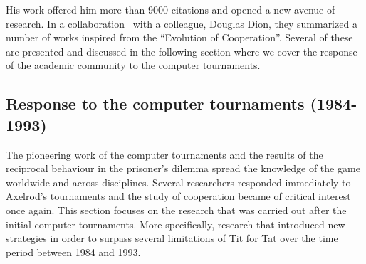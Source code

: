 \documentclass{article}
\theoremstyle{definition}
\begin{document}
His work offered him more than 9000 citations and opened a new avenue of research.
In a collaboration~\cite{Axelrod1988} with a colleague, Douglas Dion, they summarized
a number of works inspired from the ``Evolution of Cooperation''.
Several of these are presented and discussed in the following section where
we cover the response of the academic community to the computer tournaments.

\subsection{Response to the computer tournaments (1984-1993)}
\label{section:responses_to_computer_tournament}

The pioneering work of the computer tournaments and the results of the reciprocal behaviour
in the prisoner's dilemma spread the knowledge of the game worldwide and across
disciplines. Several researchers responded immediately to Axelrod's tournaments
and the study of cooperation became of critical interest once again.
This section focuses on the research that was carried out after the initial
computer tournaments. More specifically, research that introduced new strategies
in order to surpass several limitations of Tit for Tat over the time period between
1984 and 1993.

\end{document}
